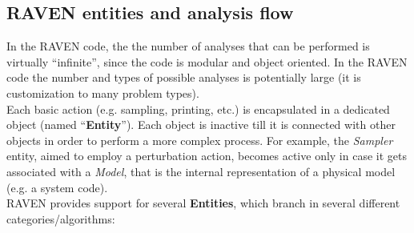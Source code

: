 \subsection{RAVEN entities and analysis flow}
\label{sub:EntitiesAndFlow}
In the RAVEN code, the the number of analyses that can be performed is virtually ``infinite'',
since the code is modular and object oriented.
In the RAVEN code the number and types of possible analyses is potentially large (it is customization to many problem types).
\\Each basic action (e.g. sampling, printing, etc.) is encapsulated in
a dedicated object (named ``\textbf{Entity}''). Each object is inactive till it is connected with
other objects in order to perform a more complex process. For example,
the \textit{Sampler} entity, aimed to employ a perturbation action, becomes active only in case
it gets associated with a \textit{Model}, that is the internal representation of a physical model (e.g. a system code).
\\RAVEN provides support for several \textbf{Entities}, which branch in several different categories/algorithms:
